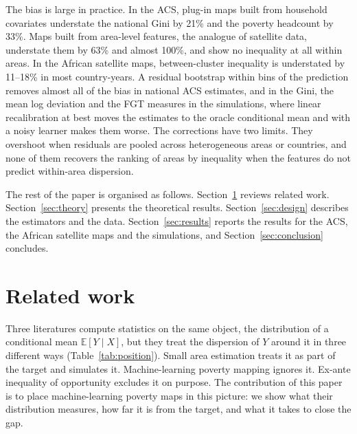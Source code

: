\documentclass[pdflatex,sn-mathphys-ay]{sn-jnl}
\theoremstyle{thmstyleone}%
\theoremstyle{thmstyletwo}%
\theoremstyle{thmstylethree}%
\newcommand{\E}{\mathbb{E}}
\begin{document}
The bias is large in practice. In the ACS, plug-in maps built from household covariates understate the national Gini by 21\% and the poverty headcount by 33\%. Maps built from area-level features, the analogue of satellite data, understate them by 63\% and almost 100\%, and show no inequality at all within areas. In the African satellite maps, between-cluster inequality is understated by 11--18\% in most country-years. A residual bootstrap within bins of the prediction removes almost all of the bias in national ACS estimates, and in the Gini, the mean log deviation and the FGT measures in the simulations, where linear recalibration at best moves the estimates to the oracle conditional mean and with a noisy learner makes them worse. The corrections have two limits. They overshoot when residuals are pooled across heterogeneous areas or countries, and none of them recovers the ranking of areas by inequality when the features do not predict within-area dispersion.

The rest of the paper is organised as follows. Section~\ref{sec:lit} reviews related work. Section~\ref{sec:theory} presents the theoretical results. Section~\ref{sec:design} describes the estimators and the data. Section~\ref{sec:results} reports the results for the ACS, the African satellite maps and the simulations, and Section~\ref{sec:conclusion} concludes.

\section{Related work}\label{sec:lit}

Three literatures compute statistics on the same object, the distribution of a conditional mean $\E[Y\mid X]$, but they treat the dispersion of $Y$ around it in three different ways (Table~\ref{tab:position}). Small area estimation treats it as part of the target and simulates it. Machine-learning poverty mapping ignores it. Ex-ante inequality of opportunity excludes it on purpose. The contribution of this paper is to place machine-learning poverty maps in this picture: we show what their distribution measures, how far it is from the target, and what it takes to close the gap.
\end{document}
